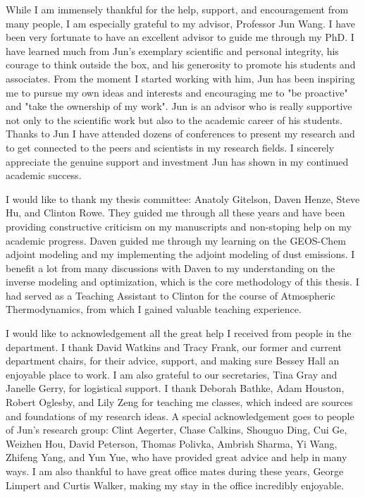\begin{acknowledgments}
While I am immensely thankful for the help, support, and encouragement
from many people, I am especially grateful to my advisor, Professor
Jun Wang. I have been very fortunate to have an excellent advisor 
to guide me through my PhD. I have learned much from Jun's exemplary 
scientific and personal integrity, his courage to think outside the box, 
and his generosity to promote his students and associates.
From the moment I started working with him, Jun has been inspiring me to
pursue my own ideas and interests and encouraging me to "be proactive"
and "take the ownership of my work". Jun is an advisor who is really
supportive not only to the scientific work but also to the academic
career of his students. Thanks to Jun I have attended dozens of 
conferences to present my research and to get connected to the peers and 
scientists in my research fields. I sincerely appreciate the genuine
support and investment Jun has shown in my continued academic success. 

I would like to thank my thesis committee: Anatoly Gitelson, Daven Henze, 
Steve Hu, and Clinton Rowe. They guided me through all these years and
have been providing constructive criticism on my manuscripts 
and non-stoping help on my academic progress. Daven guided me through 
my learning on the GEOS-Chem adjoint modeling and my
implementing the adjoint modeling of dust emissions. I benefit a lot from
many discussions with Daven to my understanding on the inverse modeling
and optimization, which is the core methodology of this thesis. I had
served as a Teaching Assistant to Clinton for the course of Atmospheric
Thermodynamics, from which I gained valuable teaching experience. 

I would like to acknowledgement all the great help I received from
people in the department. I thank David
Watkins and Tracy Frank, our former and current department chairs, for
their advice, support, and making sure Bessey Hall an enjoyable place to
work. I am also grateful to our secretaries, Tina Gray and Janelle Gerry, 
for logistical support. I thank Deborah Bathke, Adam Houston, 
Robert Oglesby, and Lily Zeng for teaching me classes, which indeed are 
sources and foundations of my research ideas. 
A special acknowledgement goes to people of
Jun's research group: Clint Aegerter, Chase Calkins, Shouguo Ding, Cui Ge, 
Weizhen Hou, David Peterson, Thomas Polivka, Ambrish Sharma, Yi Wang,
Zhifeng Yang, and Yun Yue, who have provided
great advice and help in many ways. I am also thankful to have great
office mates during these years, George Limpert and Curtis Walker, making my
stay in the office incredibly enjoyable. 


\end{acknowledgments}
